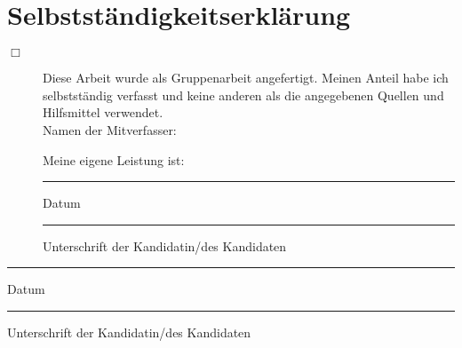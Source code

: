 \chapter{Selbstständigkeitserklärung}

\begin{description}


\item[$\Box$] Diese Arbeit wurde als Gruppenarbeit angefertigt. Meinen Anteil habe ich selbstständig verfasst und keine anderen als die angegebenen Quellen und Hilfsmittel verwendet.\\

Namen der Mitverfasser:
\vspace{3cm}

Meine eigene Leistung ist:
\vspace{2cm}

\begin{minipage}[t]{3cm}
	\rule{3cm}{0.5pt}
	Datum
\end{minipage}
\hfill
\begin{minipage}[t]{9cm}
	\rule{9cm}{0.5pt}
	Unterschrift der Kandidatin/des Kandidaten
\end{minipage}


\end{description}

\vspace{2cm}

\begin{minipage}[t]{3cm}
	\rule{3cm}{0.5pt}
	Datum
\end{minipage}
\hfill
\begin{minipage}[t]{9cm}
	\rule{9cm}{0.5pt}
	Unterschrift der Kandidatin/des Kandidaten
\end{minipage}
